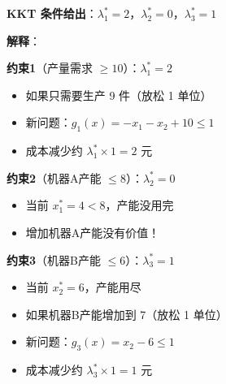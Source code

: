 \documentclass[12pt, a4paper]{ctexart}
\begin{document}
\begin{blackboard}[影子价格的计算与解释]

\textbf{KKT 条件给出}：$\lambda_1^* = 2$，$\lambda_2^* = 0$，$\lambda_3^* = 1$

\textbf{解释}：

\textbf{约束1}（产量需求 $\geq 10$）：$\lambda_1^* = 2$
\begin{itemize}
    \item 如果只需要生产 9 件（放松 1 单位）
    \item 新问题：$g_1(x) = -x_1 - x_2 + 10 \leq 1$
    \item 成本减少约 $\lambda_1^* \times 1 = 2$ 元
\end{itemize}

\textbf{约束2}（机器A产能 $\leq 8$）：$\lambda_2^* = 0$
\begin{itemize}
    \item 当前 $x_1^* = 4 < 8$，产能没用完
    \item 增加机器A产能没有价值！
\end{itemize}

\textbf{约束3}（机器B产能 $\leq 6$）：$\lambda_3^* = 1$
\begin{itemize}
    \item 当前 $x_2^* = 6$，产能用尽
    \item 如果机器B产能增加到 7（放松 1 单位）
    \item 新问题：$g_3(x) = x_2 - 6 \leq 1$
    \item 成本减少约 $\lambda_3^* \times 1 = 1$ 元
\end{itemize}

\end{blackboard}
\end{document}
